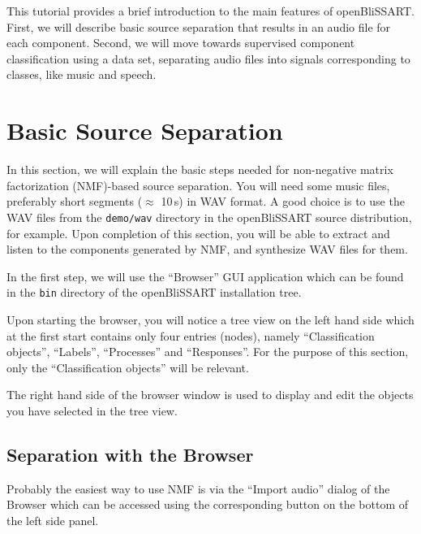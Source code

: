 %
%


This tutorial provides a brief introduction to the main features of
openBliSSART. First, we will describe basic source separation that results in
an audio file for each component. Second, we will move towards supervised
component classification using a data set, separating audio files into signals
corresponding to classes, like music and speech.


\section{Basic Source Separation}

In this section, we will explain the basic steps needed for non-negative matrix factorization (NMF)-based source separation. You will need some music files, preferably short segments ($\approx$ 10\,s) in WAV format. A good choice is to use the WAV files from the {\tt demo/wav} directory in the openBliSSART source distribution, for example. Upon completion of this section, you will be able to extract and listen to the components generated by NMF, and synthesize WAV files for them.

In the first step, we will use the ``Browser'' GUI application
which can be found in the {\tt bin} directory of the openBliSSART installation
tree.

Upon starting the browser, you will notice a tree view on the left hand side
which at the first start contains only four entries (nodes), namely
``Classification objects'', ``Labels'', ``Processes'' and ``Responses''. 
For the purpose of this section, only the ``Classification objects'' will be relevant.

The right hand side of the browser window is used to display and edit the
objects you have selected in the tree view.


\subsection{Separation with the Browser}

Probably the easiest way to use NMF is via the ``Import audio'' dialog of the Browser which can be accessed using the corresponding button on the bottom of the left side panel.

